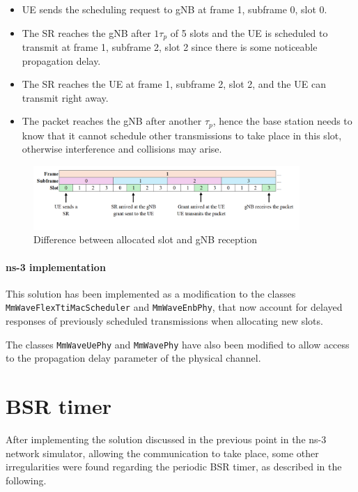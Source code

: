 \begin{itemize}
    \item \ac{UE} sends the scheduling request to \ac{gNB} at frame 1, subframe 0, slot 0.
    \item The \ac{SR} reaches the \ac{gNB} after $1\tau_p$ of 5 slots and the \ac{UE} is scheduled to transmit at frame 1, subframe 2, slot 2 since there is some noticeable propagation delay.
    \item The \ac{SR} reaches the \ac{UE} at frame 1, subframe 2, slot 2, and the \ac{UE} can transmit right away.
    \item The packet reaches the \ac{gNB} after another $\tau_p$, hence the base station needs to know that it cannot schedule other transmissions to take place in this slot, otherwise interference and collisions may arise.
\end{itemize}

\begin{figure}[ht]
    \centering
    \includegraphics[width=0.9\textwidth]{res/scheduler-allocation-pd.png}
    \caption{Difference between allocated slot and gNB reception}
    \label{fig:scheduler-allocations-pd}
\end{figure}

\paragraph{ns-3 implementation}
This solution has been implemented as a modification to the classes \texttt{MmWaveFlexTtiMacScheduler} and \texttt{MmWaveEnbPhy}, that now account for delayed responses of previously scheduled transmissions when allocating new slots.

The classes \texttt{MmWaveUePhy} and \texttt{MmWavePhy} have also been modified to allow access to the propagation delay parameter of the physical channel.

\section{BSR timer}
\label{sec:bsr-timer}
After implementing the solution discussed in the previous point in the ns-3 network simulator, allowing the communication to take place, some other irregularities were found regarding the periodic \ac{BSR} timer, as described in the following. 

